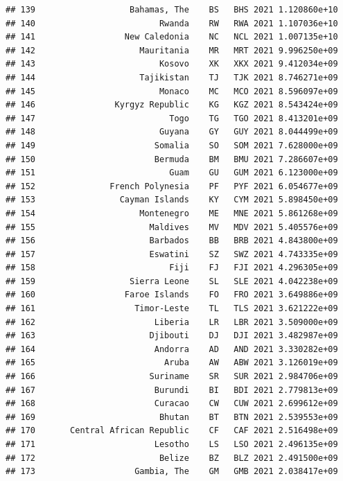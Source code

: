 \documentclass[
]{article}
\begin{document}
\begin{verbatim}
## 139                   Bahamas, The    BS   BHS 2021 1.120860e+10       
## 140                         Rwanda    RW   RWA 2021 1.107036e+10       
## 141                  New Caledonia    NC   NCL 2021 1.007135e+10       
## 142                     Mauritania    MR   MRT 2021 9.996250e+09       
## 143                         Kosovo    XK   XKX 2021 9.412034e+09       
## 144                     Tajikistan    TJ   TJK 2021 8.746271e+09       
## 145                         Monaco    MC   MCO 2021 8.596097e+09       
## 146                Kyrgyz Republic    KG   KGZ 2021 8.543424e+09       
## 147                           Togo    TG   TGO 2021 8.413201e+09       
## 148                         Guyana    GY   GUY 2021 8.044499e+09       
## 149                        Somalia    SO   SOM 2021 7.628000e+09       
## 150                        Bermuda    BM   BMU 2021 7.286607e+09       
## 151                           Guam    GU   GUM 2021 6.123000e+09       
## 152               French Polynesia    PF   PYF 2021 6.054677e+09       
## 153                 Cayman Islands    KY   CYM 2021 5.898450e+09       
## 154                     Montenegro    ME   MNE 2021 5.861268e+09       
## 155                       Maldives    MV   MDV 2021 5.405576e+09       
## 156                       Barbados    BB   BRB 2021 4.843800e+09       
## 157                       Eswatini    SZ   SWZ 2021 4.743335e+09       
## 158                           Fiji    FJ   FJI 2021 4.296305e+09       
## 159                   Sierra Leone    SL   SLE 2021 4.042238e+09       
## 160                  Faroe Islands    FO   FRO 2021 3.649886e+09       
## 161                    Timor-Leste    TL   TLS 2021 3.621222e+09       
## 162                        Liberia    LR   LBR 2021 3.509000e+09       
## 163                       Djibouti    DJ   DJI 2021 3.482987e+09       
## 164                        Andorra    AD   AND 2021 3.330282e+09       
## 165                          Aruba    AW   ABW 2021 3.126019e+09       
## 166                       Suriname    SR   SUR 2021 2.984706e+09       
## 167                        Burundi    BI   BDI 2021 2.779813e+09       
## 168                        Curacao    CW   CUW 2021 2.699612e+09       
## 169                         Bhutan    BT   BTN 2021 2.539553e+09       
## 170       Central African Republic    CF   CAF 2021 2.516498e+09       
## 171                        Lesotho    LS   LSO 2021 2.496135e+09       
## 172                         Belize    BZ   BLZ 2021 2.491500e+09       
## 173                    Gambia, The    GM   GMB 2021 2.038417e+09       

\end{verbatim}
\end{document}
